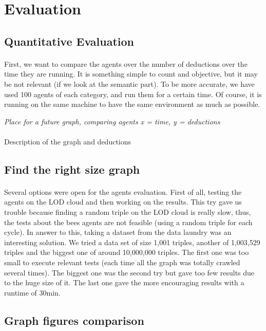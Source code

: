 \documentclass{article}
\begin{document}
\section{Evaluation}
	\subsection{Quantitative Evaluation}
		\paragraph{}
			First, we want to compare the agents over the number of deductions over the time they are running.
			It is something simple to count and objective, but it may be not relevant (if we look at the semantic part).
			To be more accurate, we have used 100 agents of each category, and run them for a certain time.
			Of course, it is running on the same machine to have the same environment as much as possible.
		\begin{center}
			\textit{Place for a future graph, comparing agents x = time, y = deductions}
		\end{center}
		\paragraph{}
			Description of the graph and deductions
	\subsection{Find the right size graph}
		\paragraph{}
			Several options were open for the agents evaluation.
			First of all, testing the agents on the LOD cloud and then working on the results.
			This try gave us trouble because finding a random triple on the LOD cloud is really slow,
			thus, the tests about the bees agents are not feasible (using a random triple for each cycle).
			In answer to this, taking a dataset from the data laundry was an interesting solution.
			We tried a data set of size 1,001 triples, another of 1,003,529 triples and the biggest one of around 10,000,000 triples.
			The first one was too small to execute relevant tests (each time all the graph was totally crawled several times).
			The biggest one was the second try but gave too few results due to the huge size of it.
			The last one gave the more encouraging results with a runtime of 30min.
	\subsection{Graph figures comparison}
\end{document}
